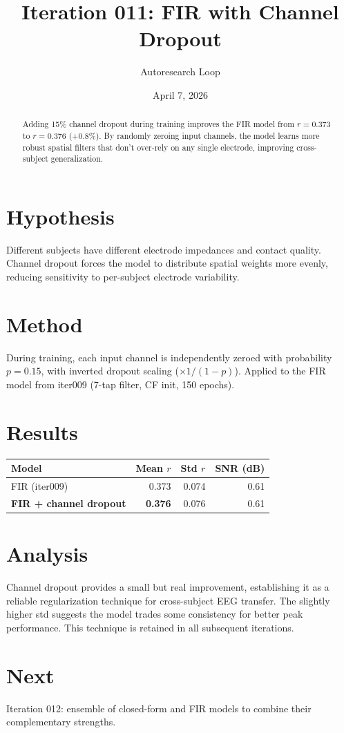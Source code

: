 \documentclass[11pt,a4paper]{article}
\title{Iteration 011: FIR with Channel Dropout}
\author{Autoresearch Loop}
\date{April 7, 2026}
\begin{document}
\maketitle

\begin{abstract}
Adding 15\% channel dropout during training improves the FIR model from
$r=0.373$ to $r=0.376$ (+0.8\%). By randomly zeroing input channels,
the model learns more robust spatial filters that don't over-rely on
any single electrode, improving cross-subject generalization.
\end{abstract}

\section{Hypothesis}
Different subjects have different electrode impedances and contact quality.
Channel dropout forces the model to distribute spatial weights more evenly,
reducing sensitivity to per-subject electrode variability.

\section{Method}
During training, each input channel is independently zeroed with probability
$p=0.15$, with inverted dropout scaling ($\times 1/(1-p)$). Applied to the
FIR model from iter009 (7-tap filter, CF init, 150 epochs).

\section{Results}
\begin{table}[H]
\centering
\begin{tabular}{lrrr}
\toprule
Model & Mean $r$ & Std $r$ & SNR (dB) \\
\midrule
FIR (iter009) & 0.373 & 0.074 & 0.61 \\
\textbf{FIR + channel dropout} & \textbf{0.376} & 0.076 & 0.61 \\
\bottomrule
\end{tabular}
\end{table}

\section{Analysis}
Channel dropout provides a small but real improvement, establishing it as a
reliable regularization technique for cross-subject EEG transfer. The
slightly higher std suggests the model trades some consistency for better
peak performance. This technique is retained in all subsequent iterations.

\section{Next}
Iteration 012: ensemble of closed-form and FIR models to combine their
complementary strengths.
\end{document}

